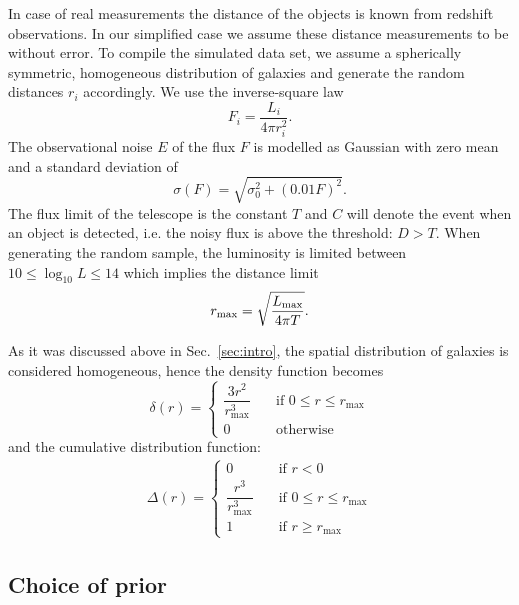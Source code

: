 In case of real measurements the distance of the objects is known from redshift observations.
In our simplified case we assume these distance measurements to be without error.
To compile the simulated data set, we assume a spherically symmetric, homogeneous distribution of galaxies and generate the random distances $r_i$ accordingly.
We use the inverse-square law
\begin{equation}
F_i = \frac{L_i}{4 \pi r_i^2}.
\end{equation}
The observational noise $E$ of the flux $F$ is modelled as Gaussian with zero mean and a standard deviation of
\begin{equation}
\sigma(F)=\sqrt{\sigma_{0}^2+(0.01F)^2}.
\label{eq:error}
\end{equation}
The flux limit of the telescope is the constant $T$ and $C$ will denote the event when an object is detected, i.e. the noisy flux is above the threshold: $D > T$.
When generating the random sample, the luminosity is limited between $10 \leq \log_{10}{L} \leq 14$ which implies the distance limit
\begin{equation}
r_\textnormal{max} = \sqrt{\frac{L_\textnormal{max}}{4 \pi T}}.
\end{equation}

As it was discussed above in Sec.~\ref{sec:intro}, the spatial distribution of galaxies is considered homogeneous, hence the density function becomes \begin{equation}\label{eq:dist_dens_func}
\delta(r) = 
\begin{cases} 
    \dfrac{3r^{2}}{r_{\max}^{3}} & \quad \text{if } 0\leq r\leq r_{\max}\\
    0 & \quad \text{otherwise}
\end{cases} 
\end{equation}
and the cumulative distribution function: \begin{align}\label{eq:dist_cum_func} \Delta(r)= \begin{cases} 0 & \quad \text{if } r<0\\ \dfrac{r^{3}}{r_{\max}^{3}} & \quad \text{if } 0\leq r\leq r_{\max}\\ 1 & \quad \text{if } r\geq r_{\max} \end{cases} \end{align}


\subsection{Choice of prior}

